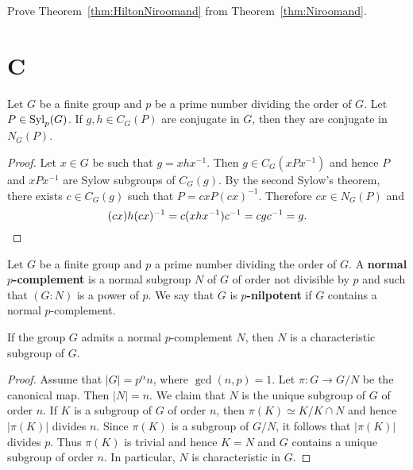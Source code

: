 \begin{exercise}
Prove Theorem~\ref{thm:HiltonNiroomand} from Theorem~\ref{thm:Niroomand}. 
\end{exercise}



\section*{C}

\begin{lemma}
	\label{lem:normal_complement}
	Let $G$ be a finite group and $p$ be a prime number dividing the order of $G$. Let
	$P\in\mathrm{Syl}_p(G)$. If $g,h\in C_G(P)$ are conjugate in $G$, then they are
	conjugate in $N_G(P)$.
\end{lemma}

\begin{proof}
	Let $x\in G$ be such that $g=xhx^{-1}$. Then $g\in C_G(xPx^{-1})$ and hence $P$
	and $xPx^{-1}$ are Sylow subgroups of $C_G(g)$. By the second Sylow's theorem, 
	there exists 
	$c\in C_G(g)$ such that $P=cxP(cx)^{-1}$. Therefore $cx\in N_G(P)$ and
	\[
	(cx)h(cx)^{-1}=c(xhx^{-1})c^{-1}=cgc^{-1}=g.\qedhere
	\]
\end{proof}

Let $G$ be a finite group and $p$ a prime number dividing the order of $G$. A 
\textbf{normal $p$-complement} is a normal subgroup $N$ of $G$ of
order not divisible by $p$ and such that $(G:N)$ is a power of $p$.
We say that $G$ is \textbf{$p$-nilpotent} if $G$ contains a normal $p$-complement.

\begin{proposition}
	If the group $G$ admits a normal $p$-complement $N$, then $N$ is a characteristic subgroup of $G$.
\end{proposition}

\begin{proof}
	Assume that $|G|=p^\alpha n$, where $\gcd(n,p)=1$. Let 
	$\pi\colon G\to G/N$ be the canonical map. Then $|N|=n$. We claim that 
	$N$ is the unique subgroup of $G$ of order $n$. If
	$K$ is a subgroup of $G$ of order $n$, then $\pi(K)\simeq K/K\cap N$
	and hence $|\pi(K)|$ divides $n$. Since $\pi(K)$ is a subgroup of $G/N$, 
	it follows that 
	$|\pi(K)|$ divides $p$. Thus $\pi(K)$ is trivial and hence 
	$K=N$ and $G$ contains a unique subgroup of order $n$. In particular, $N$ is characteristic in $G$. 
\end{proof}

